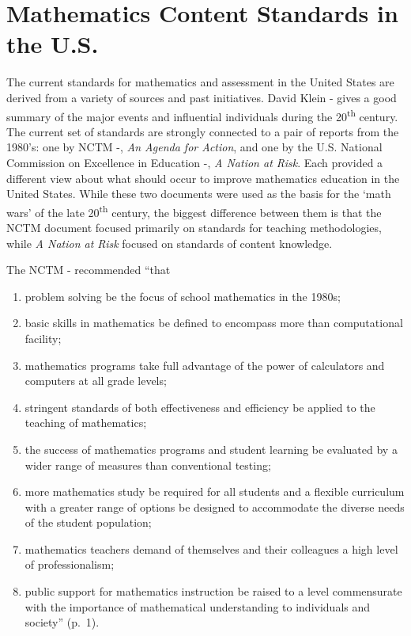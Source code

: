 \documentclass[
]{book}
\let\stdsection\section
\renewcommand\section{\newpage\stdsection}
\theoremstyle{definition}
\theoremstyle{definition}
\theoremstyle{definition}
\theoremstyle{definition}
\theoremstyle{remark}
\begin{document}
\hypertarget{mathematics-content-standards-in-the-u.s.}{%
\section{Mathematics Content Standards in the U.S.}\label{mathematics-content-standards-in-the-u.s.}}

The current standards for mathematics and assessment in the United States are derived from a variety of sources and past initiatives. David Klein -\citet{Klein2003} gives a good summary of the major events and influential individuals during the 20\textsuperscript{th} century. The current set of standards are strongly connected to a pair of reports from the 1980's: one by NCTM -\citet{NCTM1980}, \emph{An Agenda for Action}, and one by the U.S. National Commission on Excellence in Education -\citet{NCEE1983}, \emph{A Nation at Risk}. Each provided a different view about what should occur to improve mathematics education in the United States. While these two documents were used as the basis for the `math wars' of the late 20\textsuperscript{th} century, the biggest difference between them is that the NCTM document focused primarily on standards for teaching methodologies, while \emph{A Nation at Risk} focused on standards of content knowledge.

The NCTM -\citet{NCTM1980} recommended ``that

\begin{enumerate}
\def\labelenumi{\arabic{enumi}.}
\item
  problem solving be the focus of school mathematics in the 1980s;
\item
  basic skills in mathematics be defined to encompass more than computational facility;
\item
  mathematics programs take full advantage of the power of calculators and computers at all grade levels;
\item
  stringent standards of both effectiveness and efficiency be applied to the teaching of mathematics;
\item
  the success of mathematics programs and student learning be evaluated by a wider range of measures than conventional testing;
\item
  more mathematics study be required for all students and a flexible curriculum with a greater range of options be designed to accommodate the diverse needs of the student population;
\item
  mathematics teachers demand of themselves and their colleagues a high level of professionalism;
\item
  public support for mathematics instruction be raised to a level commensurate with the importance of mathematical understanding to individuals and society'' (p.~1).
\end{enumerate}
\end{document}
